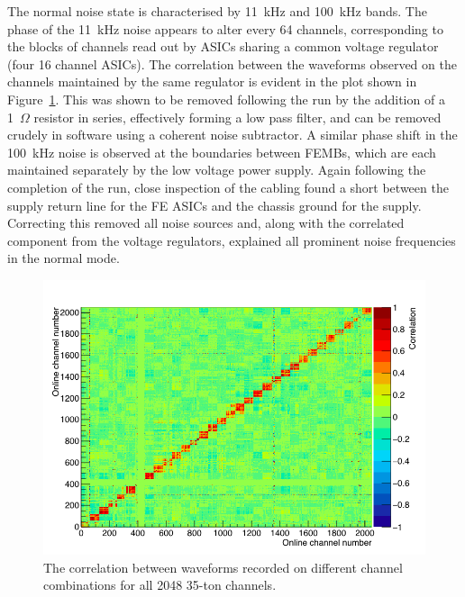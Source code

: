 The normal noise state is characterised by 11~kHz and 100~kHz bands.  The phase of the 11~kHz noise appears to alter every 64 channels, corresponding to the blocks of channels read out by ASICs sharing a common voltage regulator (four 16 channel ASICs).  The correlation between the waveforms observed on the channels maintained by the same regulator is evident in the plot shown in Figure~\ref{fig:NoiseCorrelation}.  This was shown to be removed following the run by the addition of a 1~$\Omega$ resistor in series, effectively forming a low pass filter, and can be removed crudely in software using a coherent noise subtractor.  A similar phase shift in the 100~kHz noise is observed at the boundaries between FEMBs, which are each maintained separately by the low voltage power supply.  Again following the completion of the run, close inspection of the cabling found a short between the supply return line for the FE ASICs and the chassis ground for the supply.  Correcting this removed all noise sources and, along with the correlated component from the voltage regulators, explained all prominent noise frequencies in the normal mode.

\begin{figure}
  \centering
  \includegraphics[width=12cm]{NoiseCorrelation.png}
  \caption[The correlation between waveforms recorded on different channel combinations for all 2048 35-ton channels.]{The correlation between waveforms recorded on different channel combinations for all 2048 35-ton channels.}
  \label{fig:NoiseCorrelation}
\end{figure}


